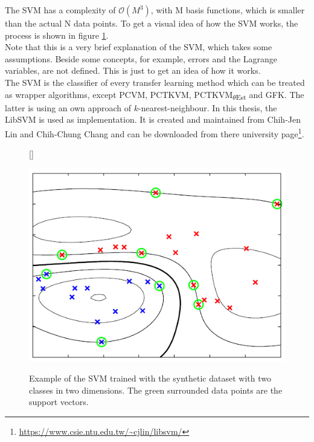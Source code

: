 The \ac{SVM} has a complexity of $\mathcal{O}(M^3)$, with M basis functions, which is smaller than the actual N data points.\cite[p. 329]{Bishop.2009}
To get a visual idea of how the \ac{SVM} works, the process is shown in figure \ref{FigSVMProd}.\\
Note that this is a very brief explanation of the \acs{SVM}, which takes some assumptions. Beside some concepts, for example, errors and the Lagrange variables, are not defined.
This is just to get an idea of how it works.\\
The \acs{SVM} is the classifier of every transfer learning method which can be treated as wrapper algorithms, except \acs{PCVM}, \acs{PCTKVM}, \acs{PCTKVM}\textsubscript{$\theta$Est} and \acs{GFK}.
The latter is using an own approach of $k$-nearest-neighbour.
In this thesis, the LibSVM is used as implementation.
It is created and maintained from Chih-Jen Lin and Chih-Chung Chang and can be downloaded from there university page\footnote{\url{https://www.csie.ntu.edu.tw/~cjlin/libsvm/}}.
\begin{figure}
	\centering
	[\FBwidth]
	{\caption[Example of SVM Clasification]{Example of the SVM trained with the synthetic dataset with two classes in two dimensions. The green surrounded data points are the support vectors. \cite[p. 331]{Bishop.2009}}}
	{\includegraphics[width=\linewidth]{figures/SVMProd.png}\label{FigSVMProd}}
\end{figure}

